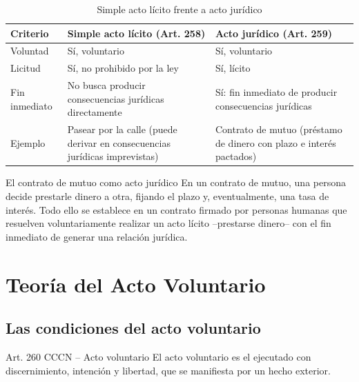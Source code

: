 \documentclass[12pt,oneside]{book}
\begin{document}
\begin{table}[H]
\centering
\caption{Simple acto lícito frente a acto jurídico}
\begin{tabularx}{\textwidth}{l X X}
\toprule
\textbf{Criterio} & \textbf{Simple acto lícito (Art. 258)} & \textbf{Acto jurídico (Art. 259)} \\
\midrule
Voluntad & Sí, voluntario & Sí, voluntario \\
Licitud & Sí, no prohibido por la ley & Sí, lícito \\
Fin inmediato & No busca producir consecuencias jurídicas directamente & Sí: fin inmediato de producir consecuencias jurídicas \\
Ejemplo & Pasear por la calle (puede derivar en consecuencias jurídicas imprevistas) & Contrato de mutuo (préstamo de dinero con plazo e interés pactados) \\
\bottomrule
\end{tabularx}
\end{table}

\begin{example}{El contrato de mutuo como acto jurídico}
En un contrato de mutuo, una persona decide prestarle dinero a otra, fijando el plazo y, eventualmente, una tasa de interés. Todo ello se establece en un contrato firmado por personas humanas que resuelven voluntariamente realizar un acto lícito --prestarse dinero-- con el fin inmediato de generar una relación jurídica.
\end{example}

\chapter{Teoría del Acto Voluntario}

\section{Las condiciones del acto voluntario}

\begin{definition}{Art. 260 CCCN -- Acto voluntario}
El acto voluntario es el ejecutado con discernimiento, intención y libertad, que se manifiesta por un hecho exterior.
\end{definition}
\end{document}
